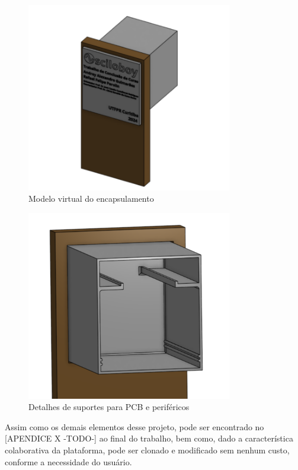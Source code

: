 \begin{figure}[htb!]
    \caption{Modelo virtual do encapsulamento}
    \label{fig:osciloboy-isometrico}
    \includegraphics[width=0.8\textwidth]{figuras/osciloboy-case-1.png}
    \fonte{}
\end{figure}

\begin{figure}[htb!]
    \caption{Detalhes de suportes para PCB e periféricos}
    \label{fig:osciloboy-detalhes}
    \includegraphics[width=0.8\textwidth]{figuras/osciloboy-case-2.png}
    \fonte{}
\end{figure}

Assim como os demais elementos desse projeto, pode ser encontrado no [APENDICE X -TODO-] ao final do trabalho, bem como, dado a característica colaborativa da plataforma, pode ser clonado e modificado sem nenhum custo, conforme a necessidade do usuário.

